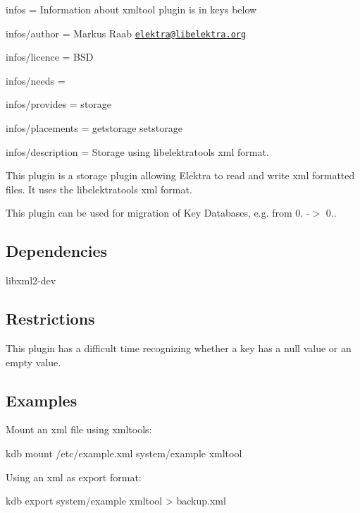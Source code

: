 
\begin{DoxyItemize}
\item infos = Information about xmltool plugin is in keys below
\item infos/author = Markus Raab \href{mailto:elektra@libelektra.org}{\tt elektra@libelektra.\+org}
\item infos/licence = B\+S\+D
\item infos/needs =
\item infos/provides = storage
\item infos/placements = getstorage setstorage
\item infos/description = Storage using libelektratools xml format.
\end{DoxyItemize}

This plugin is a storage plugin allowing Elektra to read and write xml formatted files. It uses the libelektratools xml format.

This plugin can be used for migration of Key Databases, e.\+g. from 0. -\/$>$ 0..

\subsection*{Dependencies}


\begin{DoxyItemize}
\item {\ttfamily libxml2-\/dev}
\end{DoxyItemize}

\subsection*{Restrictions}

This plugin has a difficult time recognizing whether a key has a null value or an empty value.

\subsection*{Examples}

Mount an xml file using {\ttfamily xmltools}\+: \begin{DoxyVerb}    kdb mount /etc/example.xml system/example xmltool
\end{DoxyVerb}


Using an xml as export format\+: \begin{DoxyVerb}    kdb export system/example xmltool > backup.xml\end{DoxyVerb}
 